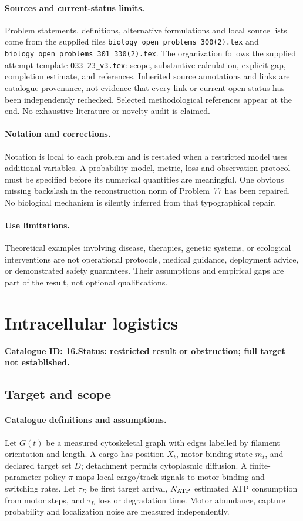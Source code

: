 \documentclass[11pt]{article}
\begin{document}
\paragraph{Sources and current-status limits.}
Problem statements, definitions, alternative formulations and local source lists
come from the supplied files
\texttt{biology\_open\_problems\_300(2).tex} and
\texttt{biology\_open\_problems\_301\_330(2).tex}.
The organization follows the supplied attempt template
\texttt{O33-23\_v3.tex}: scope, substantive calculation, explicit gap,
completion estimate, and references. Inherited source annotations and links are
catalogue provenance, not evidence that every link or current open status has
been independently rechecked. Selected methodological references appear at the
end. No exhaustive literature or novelty audit is claimed.

\paragraph{Notation and corrections.}
Notation is local to each problem and is restated when a restricted model uses
additional variables. A probability model, metric, loss and observation protocol
must be specified before its numerical quantities are meaningful. One obvious
missing backslash in the reconstruction norm of Problem~77 has been repaired.
No biological mechanism is silently inferred from that typographical repair.

\paragraph{Use limitations.}
Theoretical examples involving disease, therapies, genetic systems, or ecological
interventions are not operational protocols, medical guidance, deployment advice,
or demonstrated safety guarantees. Their assumptions and empirical gaps are part
of the result, not optional qualifications.

\setcounter{section}{15}
\section{Intracellular logistics}
\label{prob:016}
\noindent\textbf{Catalogue ID: 16.}\quad \textbf{Status: restricted result or obstruction; full target not established.}
\subsection{Target and scope}
\paragraph{Catalogue definitions and assumptions.}
Let $G(t)$ be a measured cytoskeletal graph with edges labelled by filament orientation and length. A cargo has position $X_t$, motor-binding state $m_t$, and declared target set $D$; detachment permits cytoplasmic diffusion. A finite-parameter policy $\pi$ maps local cargo/track signals to motor-binding and switching rates. Let $\tau_D$ be first target arrival, $N_{\rm ATP}$ estimated ATP consumption from motor steps, and $\tau_L$ loss or degradation time. Motor abundance, capture probability and localization noise are measured independently.
\end{document}
